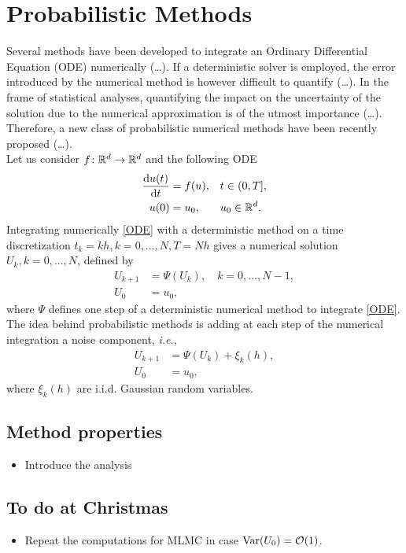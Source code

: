 \section{Probabilistic Methods}

Several methods have been developed to integrate an Ordinary Differential Equation (ODE) numerically (\ldots). If a deterministic solver is employed, the error introduced by the numerical method is however difficult to quantify (\ldots). In the frame of statistical analyses, quantifying the impact on the uncertainty of the solution due to the numerical approximation is of the utmost importance (\ldots). Therefore, a new class of probabilistic numerical methods have been recently proposed \cite{CGS16} (\ldots). \\
Let us consider $f\colon \mathbb{R}^d \to \mathbb{R}^d$ and the following ODE
\begin{equation}\label{ODE}
\begin{aligned}
	\dv{u(t)}{t} &= f(u), &&  t \in (0, T], \\
	u(0) &= u_0, && u_0 \in \mathbb{R}^d.
\end{aligned}
\end{equation}
Integrating numerically \eqref{ODE} with a deterministic method on a time discretization $t_k = kh, k = 0, \ldots, N, T = Nh$ gives a numerical solution $U_k, k = 0, \ldots, N$, defined by
\begin{equation}\label{numericalODE}
\begin{aligned}
	U_{k+1} &= \Psi(U_k), \quad k = 0, \ldots, N-1, \\
	U_{0} &= u_0, 
\end{aligned}
\end{equation}
where $\Psi$ defines one step of a deterministic numerical method to integrate \eqref{ODE}. \\
The idea behind probabilistic methods is adding at each step of the numerical integration a noise component, \textit{i.e.},
\begin{equation}\label{probabilityODE}
\begin{aligned}
	U_{k+1} &= \Psi(U_k) + \xi_k(h), \\
	U_0 &= u_0,
\end{aligned}
\end{equation}
where $\xi_k(h)$ are i.i.d. Gaussian random variables. 




\subsection{Method properties}
\begin{itemize}
	\item Introduce the analysis
\end{itemize}





\subsection{To do at Christmas}
\begin{itemize}
	\item Repeat the computations for MLMC in case $\operatorname{Var}(U_0) = \mathcal{O}(1)$. 
\end{itemize}

%

